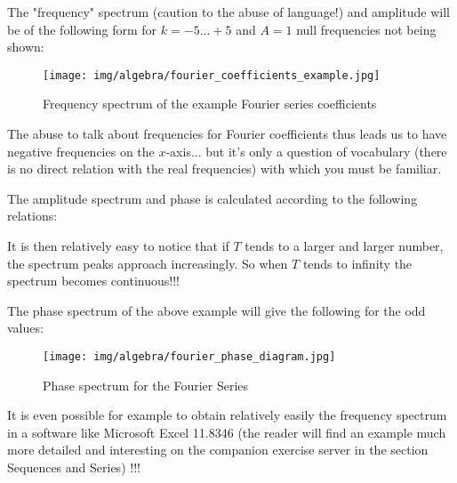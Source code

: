 	\pagebreak
	\begin{tcolorbox}[colframe=black,colback=white,sharp corners]
	The "frequency" spectrum (caution to the abuse of language!) and amplitude will be of the following form for $k=-5...+5$ and $A=1$ null frequencies not being shown:
	\begin{figure}[H]
		\centering
		\texttt{[image: img/algebra/fourier\_coefficients\_example.jpg]}
		\caption{Frequency spectrum of the example Fourier series coefficients}
	\end{figure}
	\end{tcolorbox}
	The abuse to talk about frequencies for Fourier coefficients thus leads us to have negative frequencies on the  $x$-axis... but it's only a question of vocabulary (there is no direct relation with the real frequencies) with which you must be familiar.
	
	The amplitude spectrum and phase is calculated according to the following relations:
	
	It is then relatively easy to notice that if $T$ tends to a larger and larger number, the spectrum peaks approach increasingly. So when $T$ tends to infinity the spectrum becomes continuous!!!
	
	The phase spectrum of the above example will give the following for the odd values:
	\begin{figure}[H]
		\centering
		\texttt{[image: img/algebra/fourier\_phase\_diagram.jpg]}
		\caption[]{Phase spectrum for the Fourier Series}
	\end{figure}
	It is even possible for example to obtain relatively easily the frequency spectrum in a software like Microsoft Excel 11.8346 (the reader will find an example much more detailed and interesting on the companion exercise server in the section Sequences and Series) !!!
	
